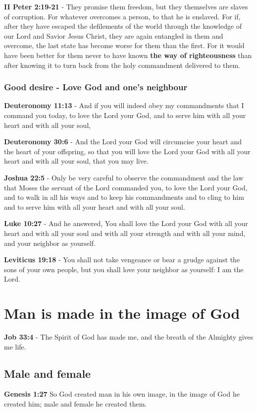 \documentclass[11pt]{article}
\begin{document}
\textbf{II Peter 2:19-21} - They promise them freedom, but they themselves are slaves of corruption. For whatever overcomes a person, to that he is enslaved. For if, after they have escaped the defilements of the world through the knowledge of our Lord and Savior Jesus Christ, they are again entangled in them and overcome, the last state has become worse for them than the first. For it would have been better for them never to have known \textbf{the way of righteousness} than after knowing it to turn back from the holy commandment delivered to them.

\subsubsection{Good desire - Love God and one's neighbour}
\label{sec:org6c38193}
\textbf{Deuteronomy 11:13} - And if you will indeed obey my commandments that I command you today, to love the Lord your God, and to serve him with all your heart and with all your soul,

\textbf{Deuteronomy 30:6} - And the Lord your God will circumcise your heart and the heart of your offspring, so that you will love the Lord your God with all your heart and with all your soul, that you may live.

\textbf{Joshua 22:5} - Only be very careful to observe the commandment and the law that Moses the servant of the Lord commanded you, to love the Lord your God, and to walk in all his ways and to keep his commandments and to cling to him and to serve him with all your heart and with all your soul.

\textbf{Luke 10:27} - And he answered, You shall love the Lord your God with all your heart and with all your soul and with all your strength and with all your mind, and your neighbor as yourself.

\textbf{Leviticus 19:18} - You shall not take vengeance or bear a grudge against the sons of your own people, but you shall love your neighbor as yourself: I am the Lord.

\section{Man is made in the image of God}
\label{sec:org843c8dc}
\textbf{Job 33:4} - The Spirit of God has made me, and the breath of the Almighty gives me life.

\subsection{Male and female}
\label{sec:orgaac888d}
\textbf{Genesis 1:27} So God created man in his own image, in the image of God he created him; male and female he created them.
\end{document}
